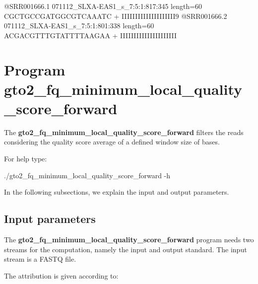 \documentclass[11pt,]{krantz}
\newenvironment{Shaded}{\begin{snugshade}}{\end{snugshade}}
\newcommand{\ExtensionTok}[1]{#1}
\newcommand{\NormalTok}[1]{#1}
\begin{document}
\begin{Shaded}
\begin{Highlighting}[]
\ExtensionTok{@SRR001666.1}\NormalTok{ 071112_SLXA-EAS1_s_7:5:1:817:345 length=60}
\ExtensionTok{CGCTGCCGATGGCGTCAAATC}
\ExtensionTok{+}
\ExtensionTok{IIIIIIIIIIIIIIIIIIII9}
\ExtensionTok{@SRR001666.2}\NormalTok{ 071112_SLXA-EAS1_s_7:5:1:801:338 length=60}
\ExtensionTok{ACGACGTTTGTATTTTAAGAA}
\ExtensionTok{+}
\ExtensionTok{IIIIIIIIIIIIIIIIIIIII}
\end{Highlighting}
\end{Shaded}

\section{Program
gto2\_fq\_minimum\_local\_quality\_score\_forward}\label{program-gto2_fq_minimum_local_quality_score_forward}

The \textbf{gto2\_fq\_minimum\_local\_quality\_score\_forward} filters
the reads considering the quality score average of a defined window size
of bases.

For help type:

\begin{Shaded}
\begin{Highlighting}[]
\ExtensionTok{./gto2_fq_minimum_local_quality_score_forward}\NormalTok{ -h}
\end{Highlighting}
\end{Shaded}

In the following subsections, we explain the input and output
parameters.

\subsection*{Input parameters}\label{input-parameters-18}


The \textbf{gto2\_fq\_minimum\_local\_quality\_score\_forward} program
needs two streams for the computation, namely the input and output
standard. The input stream is a FASTQ file.

The attribution is given according to:
\end{document}
